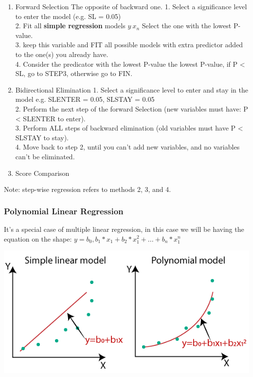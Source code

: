 \documentclass{article}
\begin{document}
\begin{itemize}
\begin{enumerate}
      \item Forward Selection
        The opposite of backward one.
        1. Select a significance level to enter the model (e.g. SL = 0.05)\\
        2. Fit all \textbf{simple regression} models \(y ~ x_n\) Select the one with the lowest P-value.\\
        3. keep this variable and FIT all possible models with extra predictor added to the one(s) you already have.\\
        4. Consider the predicator with the lowest P-value the lowest P-value, if P < SL, go to STEP3, otherwise go to FIN.\\

      \item Bidirectional Elimination
        1. Select a significance level to enter and stay in the model e.g. SLENTER = 0.05, SLSTAY = 0.05\\
        2. Perform the next step of the forward Selection (new variables must have: P < SLENTER to enter).\\
        3. Perform ALL steps of backward elimination (old variables must have P < SLSTAY to stay).\\
        4. Move back to step 2, until you can't add new variables, and no variables can't be eliminated.\\

      \item Score Comparison
    \end{enumerate}

Note: step-wise regression refers to methods 2, 3, and 4.


\subsubsection{Polynomial Linear Regression}    
It's a special case of multiple linear regression, in this case we will be having the equation on the shape: \textbf{\(y=b_0,b_1*x_1+b_2*x_1^2+...+b_n*x_1^n\)}

\begin{center}
  \includegraphics[scale=0.60]{./resources/img/02-regression/polynomial-regression.png}
\end{center}


\end{itemize}
\end{document}

